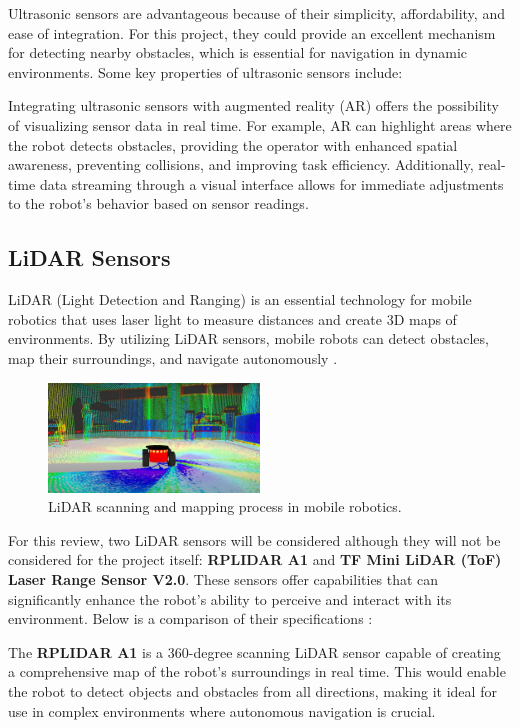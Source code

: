 Ultrasonic sensors are advantageous because of their simplicity, affordability, and ease of integration. For this project, they could provide an excellent mechanism for detecting nearby obstacles, which is essential for navigation in dynamic environments. Some key properties of ultrasonic sensors include:

Integrating ultrasonic sensors with augmented reality (AR) offers the possibility of visualizing sensor data in real time. For example, AR can highlight areas where the robot detects obstacles, providing the operator with enhanced spatial awareness, preventing collisions, and improving task efficiency. Additionally, real-time data streaming through a visual interface allows for immediate adjustments to the robot's behavior based on sensor readings.


\subsection{LiDAR Sensors} 

LiDAR (Light Detection and Ranging) is an essential technology for mobile robotics that uses laser light to measure distances and create 3D maps of environments. By utilizing LiDAR sensors, mobile robots can detect obstacles, map their surroundings, and navigate autonomously \cite{yang2022lidar}.

\begin{figure}[hb]
    \centering
    \includegraphics[width=0.5\textwidth]{ch2/figs/lidar_graphic.png}
    \caption{LiDAR scanning and mapping process in mobile robotics.}
    \label{fig:lidar_graphic}
\end{figure}

For this review, two LiDAR sensors will be considered although they will not be considered for the project itself: \textbf{RPLIDAR A1} and \textbf{TF Mini LiDAR (ToF) Laser Range Sensor V2.0}. These sensors offer capabilities that can significantly enhance the robot's ability to perceive and interact with its environment. Below is a comparison of their specifications \cite{yang2022lidar}:

The \textbf{RPLIDAR A1} is a 360-degree scanning LiDAR sensor capable of creating a comprehensive map of the robot's surroundings in real time. This would enable the robot to detect objects and obstacles from all directions, making it ideal for use in complex environments where autonomous navigation is crucial.

